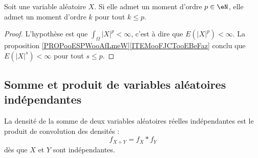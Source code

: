 \begin{proposition}		\label{PROPooIQGWooZeQJgb}
	Soit une variable aléatoire \( X\). Si elle admet un moment d'ordre \( p\in \eN\), elle admet un moment d'ordre \( k\) pour tout \( k\leq p\).
\end{proposition}

\begin{proof}
	L'hypothèse est que \( \int_{\Omega}| X |^p<\infty\), c'est à dire que \( E(| X |^p)<\infty\). La proposition \ref{PROPooESPWooAfLmeW}\ref{ITEMooFJCTooEBeFaz} conclu que \( E(| X |^s)<\infty\) pour tout \( s\leq p\).
\end{proof}

\subsection{Somme et produit de variables aléatoires indépendantes}
\label{subsecscnvommevariablsindep}


\begin{proposition}		\label{PROPooBNUEooOUvpdp}
	La densité de la somme de deux variables aléatoires réelles indépendantes est le produit de convolution des densités :
	\begin{equation}
		f_{X+Y}=f_X* f_Y
	\end{equation}
	dès que \( X\) et \( Y\) sont indépendantes.
\end{proposition}

